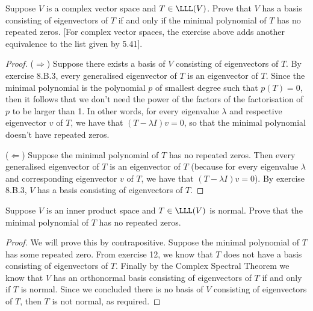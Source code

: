 \begin{exercise}{12}
  Suppose $V$ is a complex vector space and $T\in\LLL(V)$. Prove that $V$ has a basis consisting of eigenvectors of $T$ if and only if the minimal polynomial of $T$ has no repeated zeros. [For complex vector spaces, the exercise above adds another equivalence to the list given by 5.41].
\end{exercise}
\begin{proof}
 ($\Rightarrow$) Suppose there exists a basis of $V$ consisting of eigenvectors of $T$. By exercise 8.B.3, every generalised eigenvector of $T$ is an eigenvector of $T$. Since the minimal polynomial is the polynomial $p$ of smallest degree such that $p(T)=0$, then it follows that we don't need the power of the factors of the factorisation of $p$ to be larger than 1. In other words, for every eigenvalue $\lambda$ and respective eigenvector $v$ of $T$, we have that $(T-\lambda I)v=0$, so that the minimal polynomial doesn't have repeated zeros.

 ($\Leftarrow$) Suppose the minimal polynomial of $T$ has no repeated zeros. Then every generalised eigenvector of $T$ is an eigenvector of $T$ (because for every eigenvalue $\lambda$ and corresponding eigenvector $v$ of $T$, we have that $(T-\lambda I)v=0$). By exercise 8.B.3, $V$ has a basis consisting of eigenvectors of $T$.
\end{proof}

\begin{exercise}{13}
  Suppose $V$ is an inner product space and $T\in\LLL(V)$ is normal. Prove that the minimal polynomial of $T$ has no repeated zeros.
\end{exercise}
\begin{proof}
 We will prove this by contrapositive. Suppose the minimal polynomial of $T$ has some repeated zero. From exercise 12, we know that $T$ does not have a basis consisting of eigenvectors of $T$. Finally by the Complex Spectral Theorem we know that $V$ has an orthonormal basis consisting of eigenvectors of $T$ if and only if $T$ is normal. Since we concluded there is no basis of $V$ consisting of eigenvectors of $T$, then $T$ is not normal, as required.
\end{proof}

